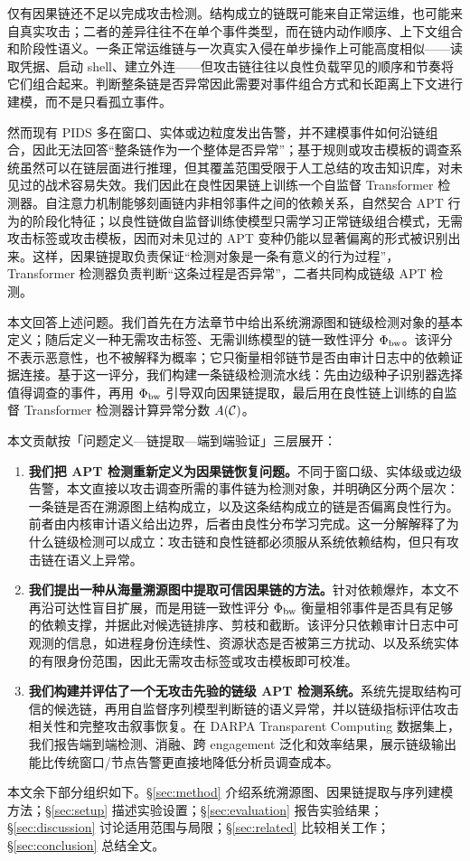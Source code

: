 仅有因果链还不足以完成攻击检测。结构成立的链既可能来自正常运维，也可能来自真实攻击；二者的差异往往不在单个事件类型，而在链内动作顺序、上下文组合和阶段性语义。一条正常运维链与一次真实入侵在单步操作上可能高度相似——读取凭据、启动 shell、建立外连——但攻击链往往以良性负载罕见的顺序和节奏将它们组合起来。判断整条链是否异常因此需要对事件组合方式和长距离上下文进行建模，而不是只看孤立事件。

然而现有 PIDS 多在窗口、实体或边粒度发出告警，并不建模事件如何沿链组合，因此无法回答“整条链作为一个整体是否异常”；基于规则或攻击模板的调查系统虽然可以在链层面进行推理，但其覆盖范围受限于人工总结的攻击知识库，对未见过的战术容易失效。我们因此在良性因果链上训练一个自监督 Transformer 检测器。自注意力机制能够刻画链内非相邻事件之间的依赖关系，自然契合 APT 行为的阶段化特征；以良性链做自监督训练使模型只需学习正常链级组合模式，无需攻击标签或攻击模板，因而对未见过的 APT 变种仍能以显著偏离的形式被识别出来。这样，因果链提取负责保证“检测对象是一条有意义的行为过程”，Transformer 检测器负责判断“这条过程是否异常”，二者共同构成链级 APT 检测。

本文回答上述问题。我们首先在方法章节中给出系统溯源图和链级检测对象的基本定义；随后定义一种无需攻击标签、无需训练模型的链一致性评分 $\Phi_{\text{bw}}$。该评分不表示恶意性，也不被解释为概率；它只衡量相邻链节是否由审计日志中的依赖证据连接。基于这一评分，我们构建一条链级检测流水线：先由边级种子识别器选择值得调查的事件，再用 $\Phi_{\text{bw}}$ 引导双向因果链提取，最后用在良性链上训练的自监督 Transformer 检测器计算异常分数 $A(\mathcal{C})$。

本文贡献按「问题定义—链提取—端到端验证」三层展开：
\begin{enumerate}
\item \textbf{我们把 APT 检测重新定义为因果链恢复问题。}不同于窗口级、实体级或边级告警，本文直接以攻击调查所需的事件链为检测对象，并明确区分两个层次：一条链是否在溯源图上结构成立，以及这条结构成立的链是否偏离良性行为。前者由内核审计语义给出边界，后者由良性分布学习完成。这一分解解释了为什么链级检测可以成立：攻击链和良性链都必须服从系统依赖结构，但只有攻击链在语义上异常。
\item \textbf{我们提出一种从海量溯源图中提取可信因果链的方法。}针对依赖爆炸，本文不再沿可达性盲目扩展，而是用链一致性评分 $\Phi_{\text{bw}}$ 衡量相邻事件是否具有足够的依赖支撑，并据此对候选链排序、剪枝和截断。该评分只依赖审计日志中可观测的信息，如进程身份连续性、资源状态是否被第三方扰动、以及系统实体的有限身份范围，因此无需攻击标签或攻击模板即可校准。
\item \textbf{我们构建并评估了一个无攻击先验的链级 APT 检测系统。}系统先提取结构可信的候选链，再用自监督序列模型判断链的语义异常，并以链级指标评估攻击相关性和完整攻击叙事恢复。在 DARPA Transparent Computing 数据集上，我们报告端到端检测、消融、跨 engagement 泛化和效率结果，展示链级输出能比传统窗口/节点告警更直接地降低分析员调查成本。
\end{enumerate}

本文余下部分组织如下。\S\ref{sec:method} 介绍系统溯源图、因果链提取与序列建模方法；\S\ref{sec:setup} 描述实验设置；\S\ref{sec:evaluation} 报告实验结果；\S\ref{sec:discussion} 讨论适用范围与局限；\S\ref{sec:related} 比较相关工作；\S\ref{sec:conclusion} 总结全文。
